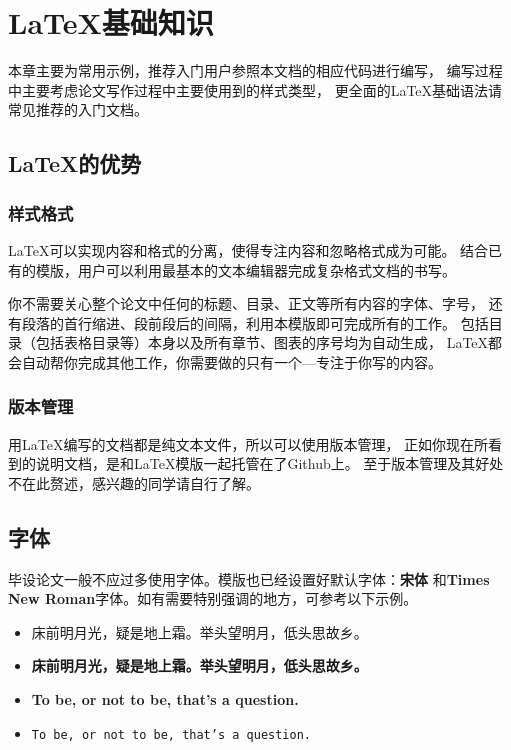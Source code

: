\chapter{\LaTeX{}基础知识}
\label{chapter-basic}

本章主要为常用示例，推荐入门用户参照本文档的相应代码进行编写，
编写过程中主要考虑论文写作过程中主要使用到的样式类型，
更全面的\LaTeX{}基础语法请常见推荐的入门文档。

\section{\LaTeX{}的优势}
\label{sec-latex-advantage}

\subsection{样式格式}
\label{subsec-style}

\LaTeX{}可以实现内容和格式的分离，使得专注内容和忽略格式成为可能。
结合已有的模版，用户可以利用最基本的文本编辑器完成复杂格式文档的书写。

你不需要关心整个论文中任何的标题、目录、正文等所有内容的字体、字号，
还有段落的首行缩进、段前段后的间隔，利用本模版即可完成所有的工作。
包括目录（包括表格目录等）本身以及所有章节、图表的序号均为自动生成，
\LaTeX{}都会自动帮你完成其他工作，你需要做的只有一个---专注于你写的内容。

\subsection{版本管理}
\label{subsec-version-control}

用\LaTeX{}编写的文档都是纯文本文件，所以可以使用版本管理，
正如你现在所看到的说明文档，是和\LaTeX{}模版一起托管在了Github上。
至于版本管理及其好处不在此赘述，感兴趣的同学请自行了解。

\section{字体}
\label{sec-font}

毕设论文一般不应过多使用字体。模版也已经设置好默认字体：{\bf 宋体}
和{\bf Times New Roman}字体。如有需要特别强调的地方，可参考以下示例。
\begin{itemize}
	\item {\heiti 床前明月光，疑是地上霜。举头望明月，低头思故乡。}
	\item {\bf 床前明月光，疑是地上霜。举头望明月，低头思故乡。}
	\item \textbf{To be, or not to be, that's a question.}
	\item \texttt{To be, or not to be, that's a question.}
\end{itemize}

